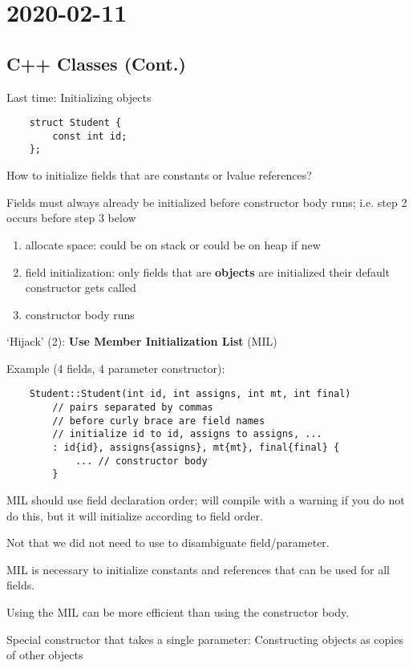 \section{2020-02-11}
\subsection{C++ Classes (Cont.)}
Last time: Initializing objects

\begin{lstlisting}
    struct Student {
        const int id;
    };
\end{lstlisting}
How to initialize fields that are constants or lvalue references?

Fields must always already be initialized before constructor body runs;
i.e. step 2 occurs before step 3 below

\begin{enumerate}[(1)]
    \item allocate space: could be on stack or could be on heap if new
    \item field initialization: only fields that are \textbf{objects} are initialized
    \subitem their default constructor gets called
    \item constructor body runs
\end{enumerate}
`Hijack' (2): \textbf{Use Member Initialization List} (MIL)

Example (4 fields, 4 parameter constructor):
\begin{lstlisting}
    Student::Student(int id, int assigns, int mt, int final)
        // pairs separated by commas
        // before curly brace are field names
        // initialize id to id, assigns to assigns, ...
        : id{id}, assigns{assigns}, mt{mt}, final{final} {
            ... // constructor body
        }
\end{lstlisting}
MIL should use field declaration order; will compile with a warning if you do not
do this, but it will initialize according to field order.

Not that we did not need to use  to disambiguate field/parameter.

MIL is necessary to initialize constants and references that can be used for
all fields.

Using the MIL can be more efficient than using the constructor body.

Special constructor that takes a single parameter: Constructing objects
as copies of other objects

